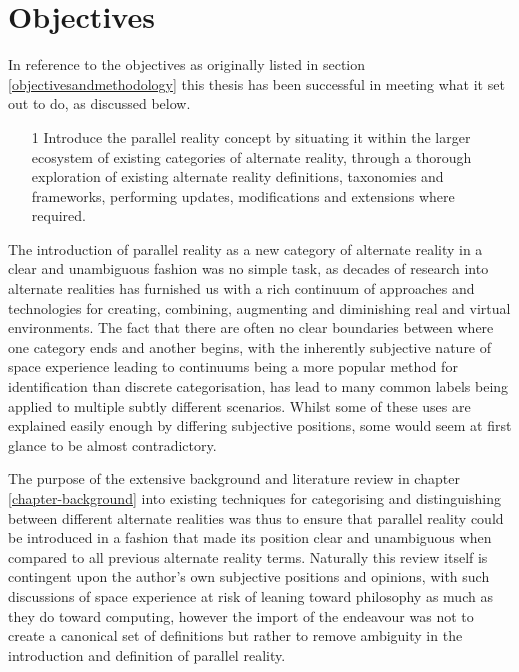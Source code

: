 
\section{Objectives}

In reference to the objectives as originally listed in section \ref{objectivesandmethodology} this thesis has been successful in meeting what it set out to do, as discussed below.

\begin{enumerate}
	\item[1] Introduce the parallel reality concept by situating it within the larger ecosystem of existing categories of alternate reality, through a thorough exploration of existing alternate reality definitions, taxonomies and frameworks, performing updates, modifications and extensions where required.
\end{enumerate}

The introduction of parallel reality as a new category of alternate reality in a clear and unambiguous fashion was no simple task, as decades of research into alternate realities has furnished us with a rich continuum of approaches and technologies for creating, combining, augmenting and diminishing real and virtual environments. The fact that there are often no clear boundaries between where one category ends and another begins, with the inherently subjective nature of space experience leading to continuums being a more popular method for identification than discrete categorisation, has lead to many common labels being applied to multiple subtly different scenarios. Whilst some of these uses are explained easily enough by differing subjective positions, some would seem at first glance to be almost contradictory.

The purpose of the extensive background and literature review in chapter \ref{chapter-background} into existing techniques for categorising and distinguishing between different alternate realities was thus to ensure that parallel reality could be introduced in a fashion that made its position clear and unambiguous when compared to all previous alternate reality terms. Naturally this review itself is contingent upon the author's own subjective positions and opinions, with such discussions of space experience at risk of leaning toward philosophy as much as they do toward computing, however the import of the endeavour was not to create a canonical set of definitions but rather to remove ambiguity in the introduction and definition of parallel reality.

